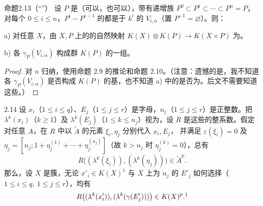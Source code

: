 \begin{SGAresult}{命题}{2.13（“”）}
设 $P$ 是（可以，也可以），带有递增族 $P^0\subset P^1\subset\cdots\subset P^n=P$，对每个 $0\leq i\leq n$，$P^i-P^{i-1}$ 的都是于 $k^i$ 的 $V_{i,\alpha}$（置 $P^{-1}=\varnothing$）。则：

 a) 对任意 $X$，由 $X,P$ 上的的自然映射 $K(X)\otimes K(P)\to K(X\times P)$ 为。

 b) 各 $\gamma_P(V_{i,\alpha})$ 构成群 $K(P)$ 的一组。
\end{SGAresult}
\begin{proof}
对 $n$ 归纳，使用命题 2.9 的推论和命题 2.10。（注意：遗憾的是，我不知道各 $\gamma_P(V_{i,\alpha})$ 是否构成 $K(P)$ 的基，也不知道 a) 中的是否为。后文不需要知道这些。）
\end{proof}
\begin{SGAresult}{}{2.14}
设 $x_i$（$1\leq i\leq q$）、$E_j$（$1\leq j\leq r$）是字母，$n_j$（$1\leq j\leq r$）是正整数。把 $\lambda^k(x_i)$（$k\geq1$）及 $\lambda^k(E_j)$（$1\leq k\leq n_j$）视为，设 $R$ 是这些的整系数。假定对任意 $A$，在 $R$ 中以 $\widetilde A$ 的元素 $\xi_i,\eta_j$ 分别代入 $x_i,E_j$，
并满足 $\varepsilon(\xi_i)=0$ 及 $\eta_j=[n_j;1+\eta_j^{(1)}+\cdots+\eta_j^{(n_j)}]$（故 $k>n_j$ 时 $\eta_j^{(k)}=0$），总有
\[
R\bigl((\lambda^k(\xi_i)),(\lambda^k(\eta_j))\bigr)\in\widetilde A^p.
\]
那么，设 $X$ 是簇，无论 $x'_i\in K(X)^1$ 与 $X$ 上为 $n_j$ 的 $E'_j$ 如何选择（$1\leq i\leq q,\ 1\leq j\leq r$），均有
\[
R\bigl((\lambda^k(x'_i)),(\lambda^k(\gamma(E'_j)))\bigr)\in K(X)^p.\footnotemark
\]
\end{SGAresult}
